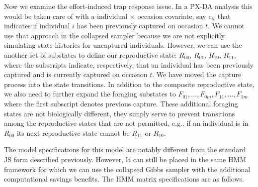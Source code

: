 \documentclass[12pt]{article}
\begin{document}
Now we examine the effort-induced trap response issue. In a PX-DA analysis this would be taken care of with a individual $\times$ occasion covariate, say $c_{it}$ that indicates if individual $i$ has been previously captured on occasion $t$. We cannot use that approach in the collapsed sampler because we are not explicitly simulating state-histories for uncaptured individuals. However, we can use the another set of substates to define our reproductive state: $R_{00}$, $R_{01}$, $R_{10}$, $R_{11}$, where the subscripts indicate, respectively, that an individual has been previously captured and is currently captured on occasion $t$. We have moved the capture process into the state transitions. In addition to the composite reproductive state, we also need to further expand the foraging substates to $F_{01},\dots,F_{0m},F_{11},\dots,F_{1m}$ where the first subscript denotes previous capture. These additional foraging states are not biologically different, they simply serve to prevent transitions among the reproductive states that are not permitted, e.g., if an individual is in $R_{00}$ its next reproductive state cannot be $R_{11}$ or $R_{10}$.

The model specifications for this model are notably different from the standard JS form described previously. However, It can still be placed in the same HMM framework for which we can use the collapsed Gibbs sampler with the additional computational savings benefits. The HMM matrix specifications are as follows.
\end{document}
